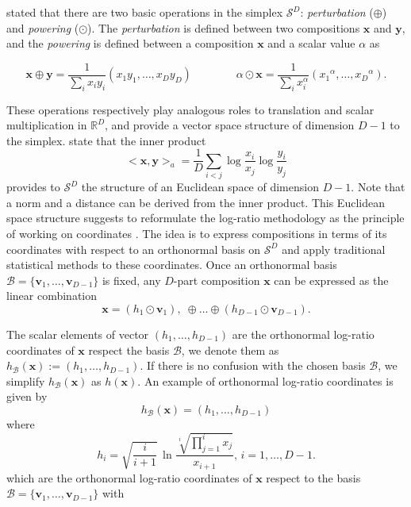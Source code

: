\documentclass[10pt, a4paper]{article}
\begin{document}
 \noindent \cite{aitchison1986statistical} stated that  there are two basic operations in the simplex $\mathcal{S}^D$: \emph{perturbation} ($\oplus$) and 
 \emph{powering} ($\odot$). The \emph{perturbation} is defined between two compositions $\textbf{x}$ 
and $\textbf{y}$,  and the \emph{powering} is defined between a composition $\textbf{x}$ and a scalar value $\alpha$ as

\begin{equation}
\textbf{x} \oplus \textbf{y} =  \frac{1}{\sum_i x_i y_i}( x_1 y_1, \dots, x_D y_D) \qquad\qquad \alpha
 \odot \textbf{x} =  \frac{1}{\sum_i x_i^\alpha}( {x_1}^\alpha, \dots, {x_D}^\alpha).
\label{pert_pow}
\end{equation}

These operations respectively play analogous roles to translation and scalar multiplication in $\mathbb{R}^D$, and provide a vector space
structure of dimension $D-1$ to the simplex. \cite{PE01} state that the inner product 
\begin{equation}
<\textbf{x}, \textbf{y}>_a = \frac{1}{D} \sum_{i < j} \log \frac{x_i}{x_j} \log \frac{y_i}{y_j}
\label{inner_prod}
\end{equation}
 provides to $\mathcal{S}^D$ the structure of an Euclidean space of dimension $D-1$. Note that a norm and a distance can be derived from the inner product.
This Euclidean space structure suggests to reformulate the log-ratio methodology as the principle of working on coordinates \citep{MPE2011}. The idea is to express compositions in terms of its coordinates with respect to an orthonormal basis on $\mathcal{S}^D$ and apply
traditional statistical methods to these coordinates. Once an orthonormal basis $\mathcal{B} = \{\textbf{v}_1, \dots, \textbf{v}_{D-1}\}$ is fixed, any $D$-part composition $\textbf{x}$ can be expressed as the linear combination
\[
\textbf{x} = (h_1 \odot \textbf{v}_1),\; \oplus \dots  \oplus (h_{D-1} \odot \textbf{v}_{D-1}).
\]

The scalar elements of vector $(h_1, \dots, h_{D-1})$ are the orthonormal log-ratio coordinates of $\textbf{x}$ respect the basis $\mathcal{B}$, we denote them as $h_\mathcal{B}(\textbf{x}) := (h_1, \dots, h_{D-1})$. If there is no confusion with the chosen basis $\mathcal{B}$, we simplify $h_\mathcal{B}(\textbf{x})$ as $h(\textbf{x})$. An example of orthonormal log-ratio coordinates  \citep{egozcue2003isometric} is given by
\[
h_\mathcal{B}(\textbf{x}) = (h_1, \dots, h_{D-1})
\]
where
\begin{equation}
\label{eilr}
h_i=\sqrt{\frac{i}{i+1}}\,\ln\frac{\sqrt[i]
{\prod_{j=1}^{i} x_j}}{x_{i+1}},\,i=1,\dots,D-1.
\end{equation}
which are the orthonormal log-ratio coordinates of $\textbf{x}$ respect to the basis $\mathcal{B} = \{\textbf{v}_1, \dots, \textbf{v}_{D-1}\}$ with
\end{document}
